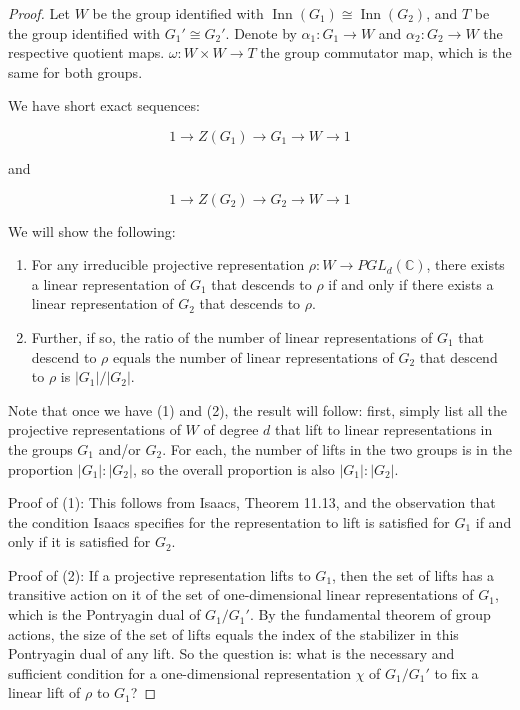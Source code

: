 \begin{proof}
  Let $W$ be the group identified with $\operatorname{Inn}(G_1) \cong
  \operatorname{Inn}(G_2)$, and $T$ be the group identified with $G_1'
  \cong G_2'$. Denote by $\alpha_1:G_1 \to W$ and $\alpha_2: G_2 \to
  W$ the respective quotient maps. $\omega: W \times W \to T$ the group
  commutator map, which is the same for both groups.

  We have short exact sequences:

  $$1 \to Z(G_1) \to G_1 \to W \to 1$$

  and

  $$1 \to Z(G_2) \to G_2 \to W \to 1$$

  We will show the following:

  \begin{enumerate}
  \item For any irreducible projective representation $\rho: W \to
    PGL_d(\mathbb{C})$, there exists a linear representation of $G_1$
    that descends to $\rho$ if and only if there exists a linear
    representation of $G_2$ that descends to $\rho$.
  \item Further, if so, the ratio of the number of linear
    representations of $G_1$ that descend to $\rho$ equals the number
    of linear representations of $G_2$ that descend to $\rho$ is
    $|G_1|/|G_2|$.
  \end{enumerate}

  Note that once we have (1) and (2), the result will follow: first,
  simply list all the projective representations of $W$ of degree $d$
  that lift to linear representations in the groups $G_1$ and/or
  $G_2$. For each, the number of lifts in the two groups is in the
  proportion $|G_1|:|G_2|$, so the overall proportion is also
  $|G_1|:|G_2|$.

  Proof of (1): This follows from Isaacs, Theorem 11.13, and the
  observation that the condition Isaacs specifies for the
  representation to lift is satisfied for $G_1$ if and only if it is
  satisfied for $G_2$. %

  Proof of (2): If a projective representation lifts to $G_1$, then
  the set of lifts has a transitive action on it of the set of
  one-dimensional linear representations of $G_1$, which is the
  Pontryagin dual of $G_1/G_1'$. By the fundamental theorem of group
  actions, the size of the set of lifts equals the index of the
  stabilizer in this Pontryagin dual of any lift. So the question is:
  what is the necessary and sufficient condition for a one-dimensional
  representation $\chi$ of $G_1/G_1'$ to fix a linear lift of $\rho$
  to $G_1$?


\end{proof}
